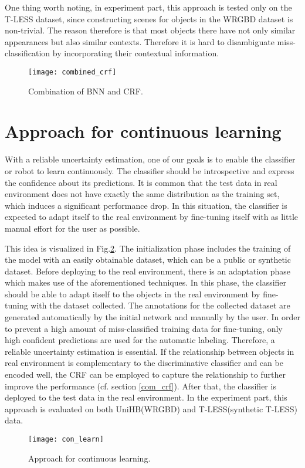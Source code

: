 One thing worth noting, in experiment part, this approach is tested only on the T-LESS dataset, since constructing scenes for objects in the WRGBD dataset is non-trivial.
The reason therefore is that most objects there have not only similar appearances but also similar contexts.
Therefore it is hard to disambiguate miss-classification by incorporating their contextual information.
\begin{figure}[H]
	\begin{center}
		\texttt{[image: combined\_crf]}
		\caption{Combination of BNN and CRF.}		
		\label{fig:combined_crf}
	\end{center}
\end{figure}
\section{Approach for continuous learning}
With a reliable uncertainty estimation, one of our goals is to enable the classifier or robot to learn continuously.
The classifier should be introspective and express the confidence about its predictions.
It is common that the test data in real environment does not have exactly the same distribution as the training set, which induces a significant performance drop.
In this situation, the classifier is expected to adapt itself to the real environment by fine-tuning itself with as little manual effort for the user as possible. 

This idea is visualized in Fig.\ref{fig:con_learn}.
The initialization phase includes the training of the model with an easily obtainable dataset, which can be a public or synthetic dataset.
Before deploying to the real environment, there is an adaptation phase which makes use of the aforementioned techniques.
In this phase, the classifier should be able to adapt itself to the objects in the real environment by fine-tuning with the dataset collected. 
The annotations for the collected dataset are generated automatically by the initial network and manually by the user.
In order to prevent a high amount of miss-classified training data for fine-tuning, only high confident predictions are used for the automatic labeling.
Therefore, a reliable uncertainty estimation is essential.
If the relationship between objects in real environment is complementary to the discriminative classifier and can be encoded well, the CRF can be employed to capture the relationship to further improve the performance (cf. section \ref{com_crf}).
After that, the classifier is deployed to the test data in the real environment.
In the experiment part, this approach is evaluated on both UniHB(WRGBD) and T-LESS(synthetic T-LESS) data.
\begin{figure}[H]
	\begin{center}
		\texttt{[image: con\_learn]}
		\caption{Approach for continuous learning.}		
		\label{fig:con_learn}
	\end{center}
\end{figure}
